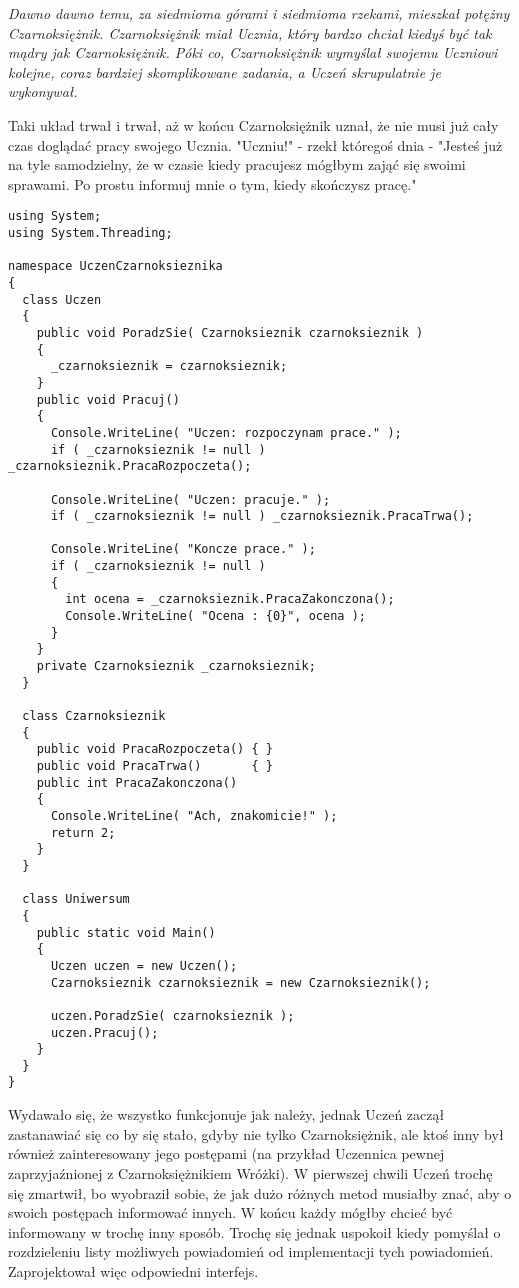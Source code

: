 {\em
Dawno dawno temu, za siedmioma górami i siedmioma rzekami, mieszkał potężny Czarnoksiężnik. Czarnoksiężnik miał
Ucznia, który bardzo chciał kiedyś być tak mądry jak Czarnoksiężnik. Póki co, Czarnoksiężnik wymyślał
swojemu Uczniowi kolejne, coraz bardziej skomplikowane zadania, a Uczeń skrupulatnie je wykonywał.

Taki układ trwał i trwał, aż w końcu Czarnoksiężnik uznał, że nie musi już cały czas doglądać pracy swojego 
Ucznia. "Uczniu!" - rzekł któregoś dnia - "Jesteś już na tyle samodzielny, że w czasie kiedy pracujesz mógłbym
zająć się swoimi sprawami. Po prostu informuj mnie o tym, kiedy skończysz pracę." 

\begin{scriptsize}
\begin{verbatim}
using System;
using System.Threading;

namespace UczenCzarnoksieznika
{	
  class Uczen
  {
    public void PoradzSie( Czarnoksieznik czarnoksieznik )
    {
      _czarnoksieznik = czarnoksieznik;  	
    }
    public void Pracuj()
    {
      Console.WriteLine( "Uczen: rozpoczynam prace." );
      if ( _czarnoksieznik != null ) _czarnoksieznik.PracaRozpoczeta();
  		
      Console.WriteLine( "Uczen: pracuje." );
      if ( _czarnoksieznik != null ) _czarnoksieznik.PracaTrwa();
  	  
      Console.WriteLine( "Koncze prace." );
      if ( _czarnoksieznik != null ) 
      {
        int ocena = _czarnoksieznik.PracaZakonczona();
        Console.WriteLine( "Ocena : {0}", ocena );
      }
    }
    private Czarnoksieznik _czarnoksieznik;
  }
  
  class Czarnoksieznik
  {
    public void PracaRozpoczeta() { }
    public void PracaTrwa()       { }
    public int PracaZakonczona() 
    {
      Console.WriteLine( "Ach, znakomicie!" );
      return 2;
    }
  }
  
  class Uniwersum
  {
    public static void Main()
    {
      Uczen uczen = new Uczen();
      Czarnoksieznik czarnoksieznik = new Czarnoksieznik();
  		
      uczen.PoradzSie( czarnoksieznik );  		
      uczen.Pracuj();
    }
  }
}
\end{verbatim}
\end{scriptsize}

Wydawało się, że wszystko funkcjonuje jak należy, jednak Uczeń zaczął zastanawiać się co by się
stało, gdyby nie tylko Czarnoksiężnik, ale ktoś inny był również zainteresowany jego postępami
(na przykład Uczennica pewnej zaprzyjaźnionej z Czarnoksiężnikiem Wróżki). W pierwszej chwili Uczeń
trochę się zmartwił, bo wyobraził sobie, że jak dużo różnych metod musiałby znać, aby o swoich postępach
informować innych. W końcu każdy mógłby chcieć być informowany w trochę inny sposób.
Trochę się jednak uspokoił kiedy pomyślał o rozdzieleniu listy możliwych powiadomień
od implementacji tych powiadomień. Zaprojektował więc odpowiedni interfejs.

}
